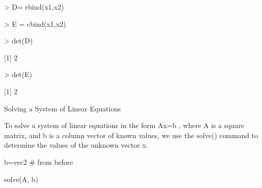 > D= rbind(x1,x2)


> E = cbind(x1,x2)


> det(D)


[1] 2


> det(E)


[1] 2

 


Solving a System of Linear Equations


To solve a system of linear equations in the form Ax=b , where A is a square matrix, and b is a column vector of known values, we use the solve() command to determine the values of the unknown vector x.










b=vec2  # from before


solve(A, b) 
 




